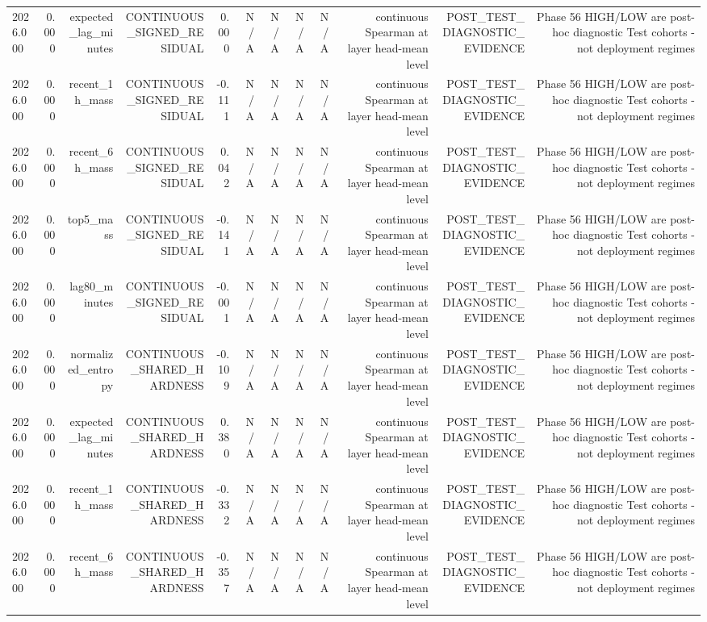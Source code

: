 \begin{table}[h!]
\begin{tabular}{lrrrrrrrrrrr}
2026.000 & 0.000 & expected\_lag\_minutes & CONTINUOUS\_SIGNED\_RESIDUAL & 0.000 & N/A & N/A & N/A & N/A & continuous Spearman at layer head-mean level & POST\_TEST\_DIAGNOSTIC\_EVIDENCE & Phase 56 HIGH/LOW are post-hoc diagnostic Test cohorts - not deployment regimes \\
2026.000 & 0.000 & recent\_1h\_mass & CONTINUOUS\_SIGNED\_RESIDUAL & -0.111 & N/A & N/A & N/A & N/A & continuous Spearman at layer head-mean level & POST\_TEST\_DIAGNOSTIC\_EVIDENCE & Phase 56 HIGH/LOW are post-hoc diagnostic Test cohorts - not deployment regimes \\
2026.000 & 0.000 & recent\_6h\_mass & CONTINUOUS\_SIGNED\_RESIDUAL & 0.042 & N/A & N/A & N/A & N/A & continuous Spearman at layer head-mean level & POST\_TEST\_DIAGNOSTIC\_EVIDENCE & Phase 56 HIGH/LOW are post-hoc diagnostic Test cohorts - not deployment regimes \\
2026.000 & 0.000 & top5\_mass & CONTINUOUS\_SIGNED\_RESIDUAL & -0.141 & N/A & N/A & N/A & N/A & continuous Spearman at layer head-mean level & POST\_TEST\_DIAGNOSTIC\_EVIDENCE & Phase 56 HIGH/LOW are post-hoc diagnostic Test cohorts - not deployment regimes \\
2026.000 & 0.000 & lag80\_minutes & CONTINUOUS\_SIGNED\_RESIDUAL & -0.001 & N/A & N/A & N/A & N/A & continuous Spearman at layer head-mean level & POST\_TEST\_DIAGNOSTIC\_EVIDENCE & Phase 56 HIGH/LOW are post-hoc diagnostic Test cohorts - not deployment regimes \\
2026.000 & 0.000 & normalized\_entropy & CONTINUOUS\_SHARED\_HARDNESS & -0.109 & N/A & N/A & N/A & N/A & continuous Spearman at layer head-mean level & POST\_TEST\_DIAGNOSTIC\_EVIDENCE & Phase 56 HIGH/LOW are post-hoc diagnostic Test cohorts - not deployment regimes \\
2026.000 & 0.000 & expected\_lag\_minutes & CONTINUOUS\_SHARED\_HARDNESS & 0.380 & N/A & N/A & N/A & N/A & continuous Spearman at layer head-mean level & POST\_TEST\_DIAGNOSTIC\_EVIDENCE & Phase 56 HIGH/LOW are post-hoc diagnostic Test cohorts - not deployment regimes \\
2026.000 & 0.000 & recent\_1h\_mass & CONTINUOUS\_SHARED\_HARDNESS & -0.332 & N/A & N/A & N/A & N/A & continuous Spearman at layer head-mean level & POST\_TEST\_DIAGNOSTIC\_EVIDENCE & Phase 56 HIGH/LOW are post-hoc diagnostic Test cohorts - not deployment regimes \\
2026.000 & 0.000 & recent\_6h\_mass & CONTINUOUS\_SHARED\_HARDNESS & -0.357 & N/A & N/A & N/A & N/A & continuous Spearman at layer head-mean level & POST\_TEST\_DIAGNOSTIC\_EVIDENCE & Phase 56 HIGH/LOW are post-hoc diagnostic Test cohorts - not deployment regimes \\

\end{tabular}
\end{table}

